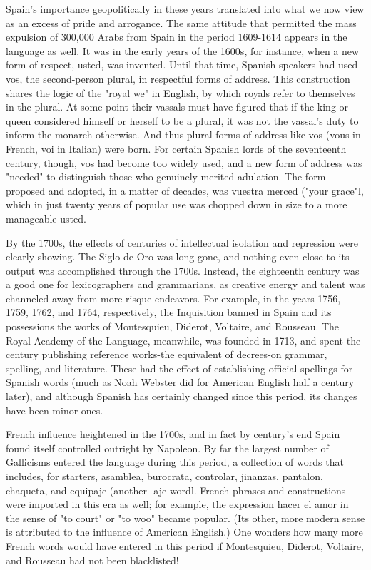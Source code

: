 Spain's importance geopolitically in these years translated into
what we now view as an excess of pride and arrogance. The same attitude that permitted the mass expulsion of 300,000 Arabs from Spain
in the period 1609-1614 appears in the language as well. It was in
the early years of the 1600s, for instance, when a new form of respect,
usted, was invented. Until that time, Spanish speakers had used vos,
the second-person plural, in respectful forms of address. This construction shares the logic of the "royal we" in English, by which royals refer to themselves in the plural. At some point their vassals must have
figured that if the king or queen considered himself or herself to be a
plural, it was not the vassal's duty to inform the monarch otherwise.
And thus plural forms of address like vos (vous in French, voi in Italian) were born. For certain Spanish lords of the seventeenth century,
though, vos had become too widely used, and a new form of address
was "needed" to distinguish those who genuinely merited adulation.
The form proposed and adopted, in a matter of decades, was vuestra
merced ("your grace"l, which in just twenty years of popular use was
chopped down in size to a more manageable usted.

By the 1700s, the effects of centuries of intellectual isolation
and repression were clearly showing. The Siglo de Oro was long gone,
and nothing even close to its output was accomplished through the
1700s. Instead, the eighteenth century was a good one for lexicographers and grammarians, as creative energy and talent was channeled
away from more risque endeavors. For example, in the years 1756,
1759, 1762, and 1764, respectively, the Inquisition banned in Spain and
its possessions the works of Montesquieu, Diderot, Voltaire, and Rousseau. The Royal Academy of the Language, meanwhile, was founded in
1713, and spent the century publishing reference works-the equivalent of decrees-on grammar, spelling, and literature. These had the
effect of establishing official spellings for Spanish words (much as
Noah Webster did for American English half a century later), and although Spanish has certainly changed since this period, its changes
have been minor ones.

French influence heightened in the 1700s, and in fact by century's end Spain found itself controlled outright by Napoleon. By far
the largest number of Gallicisms entered the language during this period, a collection of words that includes, for starters, asamblea, burocrata, controlar, jinanzas, pantalon, chaqueta, and equipaje (another
-aje wordl. French phrases and constructions were imported in this era
as well; for example, the expression hacer el amor in the sense of "to
court" or "to woo" became popular. (Its other, more modern sense is
attributed to the influence of American English.) One wonders how
many more French words would have entered in this period if Montesquieu, Diderot, Voltaire, and Rousseau had not been blacklisted!

